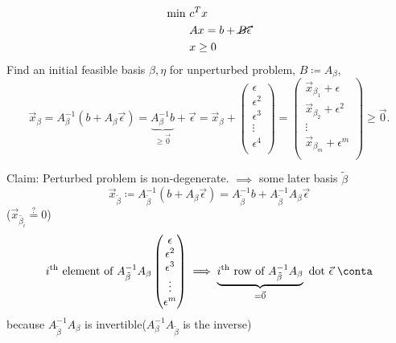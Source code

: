 \begin{align*}
	\min~ & c^Tx                              \\
	      & Ax = b + \cancel{B\vec{\epsilon}} \\
	      & x\geq 0
\end{align*}
Find an initial feasible basis \(\beta, \eta \) for unperturbed problem, \(B\coloneqq A_{\beta}\),
\[
	\vec{x}_{\beta}
	= A_{\beta}^{-1}(b + A_{\beta} \vec{\epsilon})
	= \underbrace{A^{-1}_{\beta}b}_{\geq \vec{0}} + \vec{\epsilon}
	= \vec{x}_{\beta} + \begin{pmatrix}
		\epsilon   \\
		\epsilon^2 \\
		\epsilon^3 \\
		\vdots     \\
		\epsilon^4 \\
	\end{pmatrix} = \begin{pmatrix}
		\vec{x}_{\beta_1} + \epsilon   \\
		\vec{x}_{\beta_2} + \epsilon^2 \\
		\vdots                         \\
		\vec{x}_{\beta_m} + \epsilon^m \\
	\end{pmatrix} \geq \vec{0}.
\]

Claim: Perturbed problem is non-degenerate. \(\implies\) some later basis \(\tilde{\beta}\)
\[
	\vec{x}_{\tilde{\beta}} \coloneqq A^{-1}_{\tilde{\beta}}(b + A_{\beta}\vec{\epsilon}) = A^{-1}_{\tilde{\beta}}b + A^{-1}_{\tilde{\beta}}A_{\beta}\vec{\epsilon}
\]
(\(\vec{x}_{\tilde{\beta_i}}\overset{?}{=}0\))
\[
	i^{\text{th}} \text{ element of }A^{-1}_{\tilde{\beta}}A_{\beta}\begin{pmatrix}
		\epsilon   \\
		\epsilon^2 \\
		\epsilon^3 \\
		\vdots     \\
		\epsilon^m \\
	\end{pmatrix} \implies \underbrace{i^{\text{th}} \text{ row of } A^{-1}_{\tilde{\beta}}A_{\beta}}_{=\vec{0}} \text{ dot }\vec{\epsilon}\ \conta
\]
because \(A^{-1}_{\tilde{\beta}}A_{\beta}\) is invertible(\(A^{-1}_{\beta}A_{\tilde{\beta}}\) is the inverse)